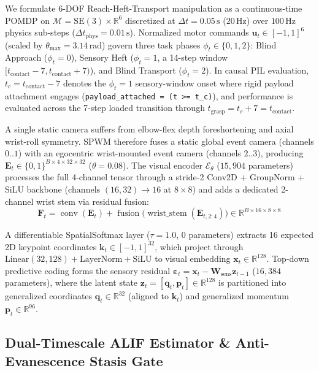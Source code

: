 \documentclass[11pt]{article}
\begin{document}
We formulate 6-DOF Reach-Heft-Transport manipulation as a continuous-time POMDP on $\mathcal{M} = \text{SE}(3) \times \mathbb{R}^6$ discretized at $\Delta t = 0.05\,\text{s}$ ($20\,\text{Hz}$) over $100\,\text{Hz}$ physics sub-steps ($\Delta t_{\text{phys}} = 0.01\,\text{s}$). Normalized motor commands $\mathbf{u}_t \in [-1, 1]^6$ (scaled by $\theta_{\max} = 3.14\,\text{rad}$) govern three task phases $\phi_t \in \{0, 1, 2\}$: Blind Approach ($\phi_t = 0$), Sensory Heft ($\phi_t = 1$, a 14-step window $[t_{\text{contact}} - 7, t_{\text{contact}} + 7)$), and Blind Transport ($\phi_t = 2$). In causal PIL evaluation, $t_c = t_{\text{contact}} - 7$ denotes the $\phi_t = 1$ sensory-window onset where rigid payload attachment engages (\texttt{payload\_attached = (t >= t\_c)}), and performance is evaluated across the 7-step loaded transition through $t_{\text{grasp}} = t_c + 7 = t_{\text{contact}}$.

A single static camera suffers from elbow-flex depth foreshortening and axial wrist-roll symmetry. SPWM therefore fuses a static global event camera (channels $0..1$) with an egocentric wrist-mounted event camera (channels $2..3$), producing $\mathbf{E}_t \in \{0, 1\}^{B \times 4 \times 32 \times 32}$ ($\theta = 0.08$). The visual encoder $\mathcal{E}_\theta$ ($15{,}904$ parameters) processes the full 4-channel tensor through a stride-2 Conv2D + GroupNorm + SiLU backbone ($\text{channels } (16, 32) \to 16$ at $8 \times 8$) and adds a dedicated 2-channel wrist stem via residual fusion:
\[
\mathbf{F}_t = \operatorname{conv}(\mathbf{E}_t) + \operatorname{fusion}\big(\operatorname{wrist\_stem}(\mathbf{E}_{t, 2:4})\big) \in \mathbb{R}^{B \times 16 \times 8 \times 8}
\]

A differentiable SpatialSoftmax layer ($\tau = 1.0$, $0$ parameters) extracts 16 expected 2D keypoint coordinates $\mathbf{k}_t \in [-1, 1]^{32}$, which project through $\text{Linear}(32, 128) + \text{LayerNorm} + \text{SiLU}$ to visual embedding $\mathbf{x}_t \in \mathbb{R}^{128}$. Top-down predictive coding forms the sensory residual $\boldsymbol{\varepsilon}_t = \mathbf{x}_t - \mathbf{W}_{\text{sens}}\mathbf{z}_{t-1}$ ($16{,}384$ parameters), where the latent state $\mathbf{z}_t = [\mathbf{q}_t, \mathbf{p}_t] \in \mathbb{R}^{128}$ is partitioned into generalized coordinates $\mathbf{q}_t \in \mathbb{R}^{32}$ (aligned to $\mathbf{k}_t$) and generalized momentum $\mathbf{p}_t \in \mathbb{R}^{96}$.

\subsection{Dual-Timescale ALIF Estimator \& Anti-Evanescence Stasis Gate}
\end{document}
